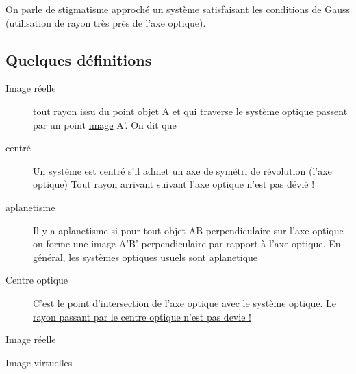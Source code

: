 On parle de stigmatisme approché un système satisfaisant les \ul{conditions de Gauss} (utilisation de rayon très près de l'axe optique).

\subsection{Quelques définitions}
\begin{description}
	\item[Image réelle] tout rayon issu du point objet A et qui traverse le système optique passent par un point \ul{image} A'. On dit que
	\item[centré] Un système est centré s'il admet un axe de symétri de révolution (l'axe optique)
	Tout rayon arrivant suivant l'axe optique n'est pas dévié !

	\item[aplanetisme] Il y a aplanetisme si pour tout objet AB perpendiculaire sur l'axe optique on forme une image A'B' perpendiculaire par rapport à l'axe optique. En général, les systèmes optiques usuels \ul{sont aplanetique}
	\item[Centre optique] C'est le point d'intersection de l'axe optique avec le système optique. \ul{Le rayon passant par le centre optique n'est pas devie !}
\end{description}

\begin{center}
Image réelle

Image virtuelles


\end{center}

